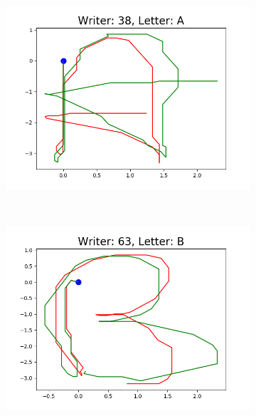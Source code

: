   \begin{figure}
  \centering
      \begin{subfigure}[b]{0.17\textwidth}
          \includegraphics[width=\textwidth]{images/framework/comparison_figures/A_38.png}
      \end{subfigure}
      ~
      \begin{subfigure}[b]{0.17\textwidth}
          \includegraphics[width=\textwidth]{images/framework/comparison_figures/B_63.png}
      \end{subfigure}
      ~
      \begin{subfigure}[b]{0.17\textwidth}

\end{subfigure}
\end{figure}
